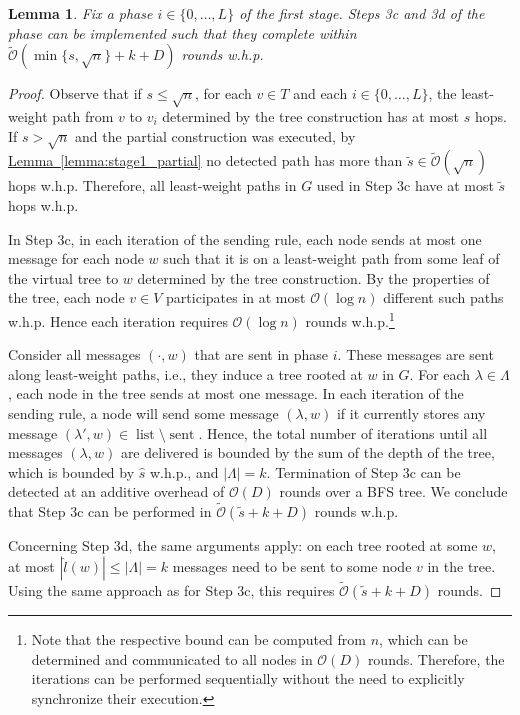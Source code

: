 \documentclass[letterpaper,11pt]{article}
\newtheorem{lemma}[theorem]{Lemma}
\newcommand{\namedref}[2]{\hyperref[#2]{#1~\ref*{#2}}}
\newcommand{\lemmaref}[1]{\namedref{Lemma}{#1}}
\newcommand{\BO}{\mathcal{O}}
\newcommand{\sO}{\tilde{\mathcal{O}}}
\newcommand{\Comp}{\lambda}
\DeclareMathOperator{\sent}{sent}
\DeclareMathOperator{\unsent}{list}
\begin{document}
\begin{lemma}\label{lemma:stage1_3cd}
Fix a phase $i\in\{0,\ldots,L\}$ of the first stage. Steps 3c and 3d of the
phase can be implemented such that they complete within
$\sO(\min\{s,\sqrt{n}\}+k+D)$ rounds w.h.p.
\end{lemma}
\begin{proof}
Observe that if $s\leq \sqrt{n}$, for each $v\in T$ and each $i\in
\{0,\ldots,L\}$, the least-weight path from $v$ to $v_i$ determined by the tree
construction has at most $s$ hops. If $s>\sqrt{n}$ and the partial construction
was executed, by \lemmaref{lemma:stage1_partial} no detected path has more than
$\tilde{s}\in \sO(\sqrt{n})$ hops w.h.p. Therefore, all least-weight paths in
$G$ used in Step 3c have at most $\tilde{s}$ hops w.h.p.

In Step 3c, in each iteration of the sending rule, each node sends at most one
message for each node $w$ such that it is on a least-weight path from some leaf
of the virtual tree to $w$ determined by the tree construction. By the
properties of the tree, each node $v\in V$ participates in at most $\BO(\log n)$
different such paths w.h.p. Hence each iteration requires $\BO(\log n)$ rounds
w.h.p.\footnote{Note that the respective bound can be computed from $n$, which
can be determined and communicated to all nodes in $\BO(D)$ rounds. Therefore,
the iterations can be performed sequentially without the need to explicitly
synchronize their execution.}

Consider all messages $(\cdot,w)$ that are sent in phase $i$. These messages are
sent along least-weight paths, i.e., they induce a tree rooted at $w$ in $G$.
For each $\Comp\in \Lambda$, each node in the tree sends at most one message. In
each iteration of the sending rule, a node will send some message $(\Comp,w)$ if
it currently stores any message $(\Comp',w)\in \unsent\setminus \sent$. Hence,
the total number of iterations until all messages $(\Comp,w)$ are delivered is
bounded by the sum of the depth of the tree, which is bounded by $\hat{s}$
w.h.p., and $|\Lambda|=k$. Termination of Step 3c can be detected at an additive
overhead of $\BO(D)$ rounds over a BFS tree. We conclude that Step 3c can be
performed in $\sO(\tilde{s}+k+D)$ rounds w.h.p.

Concerning Step 3d, the same arguments apply: on each tree rooted at some $w$,
at most $|\hat{l}(w)|\leq |\Lambda|=k$ messages need to be sent to some node $v$
in the tree. Using the same approach as for Step 3c, this requires
$\sO(\tilde{s}+k+D)$ rounds.
\end{proof}
\end{document}
